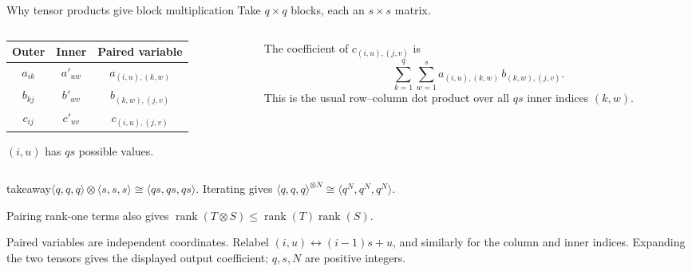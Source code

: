 \documentclass[aspectratio=169,11pt]{beamer}
\newcommand{\rank}{\operatorname{rank}}
\newcommand{\cmm}[3]{\langle #1,#2,#3\rangle}
\newcommand{\source}[1]{\vfill\par{\fontsize{7.5}{9}\selectfont\color{muted}#1\par}}
\newcommand{\takeaway}[1]{\begin{beamercolorbox}[sep=0.65em,wd=\linewidth]{takeaway}#1\end{beamercolorbox}}
\begin{document}
\begin{frame}{Why tensor products give block multiplication}
  Take $q\times q$ blocks, each an $s\times s$ matrix.
  \par\medskip
  \begin{columns}[T,onlytextwidth]
    \begin{column}{0.45\textwidth}
      {\centering
      \renewcommand{\arraystretch}{1.15}
      \begin{tabular}{@{}ccc@{}}
        \toprule
        Outer & Inner & Paired variable\\
        \midrule
        $a_{ik}$ & $a'_{uw}$ & $a_{(i,u),(k,w)}$\\
        $b_{kj}$ & $b'_{wv}$ & $b_{(k,w),(j,v)}$\\
        $c_{ij}$ & $c'_{uv}$ & $c_{(i,u),(j,v)}$\\
        \bottomrule
      \end{tabular}
      \par}
      \smallskip
      $(i,u)$ has $qs$ possible values.
    \end{column}
    \begin{column}{0.52\textwidth}
      The coefficient of $c_{(i,u),(j,v)}$ is
      \[
        \sum_{k=1}^{q}\sum_{w=1}^{s}
          a_{(i,u),(k,w)}\,b_{(k,w),(j,v)}.
      \]
      This is the usual row--column dot product over all $qs$ inner indices $(k,w)$.
    \end{column}
  \end{columns}
  \medskip
  \takeaway{$\displaystyle
    \cmm{q}{q}{q}\otimes\cmm{s}{s}{s}\cong\cmm{qs}{qs}{qs}.
    $\newline
    Iterating gives $\displaystyle
    \cmm{q}{q}{q}^{\otimes N}\cong\cmm{q^N}{q^N}{q^N}$.
  }
  \smallskip
  Pairing rank-one terms also gives
  $\rank(T\otimes S)\le\rank(T)\rank(S)$.
  \source{Paired variables are independent coordinates. Relabel
  $(i,u)\leftrightarrow(i-1)s+u$, and similarly for the column and inner indices.
  Expanding the two tensors gives the displayed output coefficient;
  $q,s,N$ are positive integers.}
\end{frame}
\end{document}
